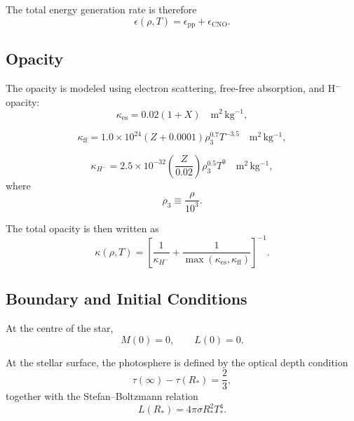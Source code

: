 \documentclass[12pt]{article}
\begin{document}
The total energy generation rate is therefore
\begin{equation}
\epsilon(\rho,T)=\epsilon_{\mathrm{pp}}+\epsilon_{\mathrm{CNO}}.
\label{eq:epsilon_total}
\end{equation}

\subsection{Opacity}

The opacity is modeled using electron scattering, free-free absorption, and H$^-$ opacity:
\begin{equation}
\kappa_{\mathrm{es}}=0.02(1+X)
\quad \mathrm{m^2\,kg^{-1}},
\end{equation}

\begin{equation}
\kappa_{\mathrm{ff}}
=
1.0\times10^{24}(Z+0.0001)\rho_3^{0.7}T^{-3.5}
\quad \mathrm{m^2\,kg^{-1}},
\end{equation}

\begin{equation}
\kappa_{H^-}
=
2.5\times10^{-32}\left(\frac{Z}{0.02}\right)\rho_3^{0.5}T^9
\quad \mathrm{m^2\,kg^{-1}},
\end{equation}
where
\begin{equation}
\rho_3 \equiv \frac{\rho}{10^3}.
\end{equation}

The total opacity is then written as
\begin{equation}
\kappa(\rho,T)
=
\left[
\frac{1}{\kappa_{H^-}}
+
\frac{1}{\max(\kappa_{\mathrm{es}},\kappa_{\mathrm{ff}})}
\right]^{-1}.
\label{eq:kappa_total}
\end{equation}

\subsection{Boundary and Initial Conditions}

At the centre of the star,
\begin{equation}
M(0)=0,
\qquad
L(0)=0.
\end{equation}

At the stellar surface, the photosphere is defined by the optical depth condition
\begin{equation}
\tau(\infty)-\tau(R_\ast)=\frac{2}{3},
\label{eq:surface_tau}
\end{equation}
together with the Stefan--Boltzmann relation
\begin{equation}
L(R_\ast)=4\pi\sigma R_\ast^2 T_\ast^4.
\label{eq:surface_sb}
\end{equation}
\end{document}
